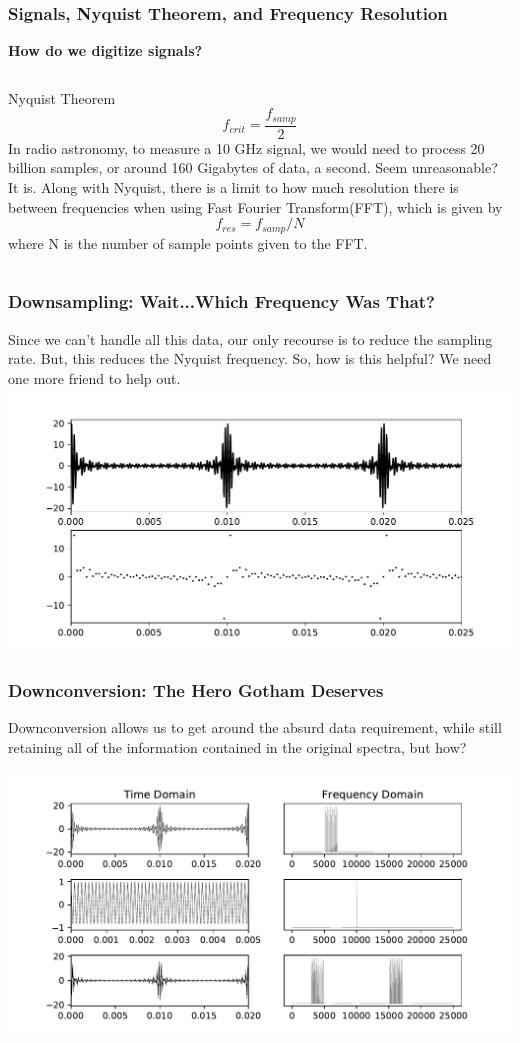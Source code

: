\documentclass{beamer}
\begin{document}
\begin{frame}
\frametitle{Signals, Nyquist Theorem, and Frequency Resolution}
\center \textbf{How do we digitize signals?}
\bigskip
\begin{columns}
Nyquist Theorem
\begin{equation}
f_{crit} = \frac{f_{samp}}{2}
\end{equation}
In radio astronomy, to measure a 10 GHz signal, we would need to process 20 billion samples, or around 160 Gigabytes of data, a second.  Seem unreasonable? It is.
Along with Nyquist, there is a limit to how much resolution there is between frequencies when using Fast Fourier Transform(FFT), which is given by 
\begin{equation}
f_{res} = f_{samp}/N
\end{equation}
where N is the number of sample points given to the FFT.
\end{columns}
\end{frame}

\begin{frame}
\frametitle{Downsampling: Wait...Which Frequency Was That?}
Since we can't handle all this data, our only recourse is to reduce the sampling rate.  But, this reduces the Nyquist frequency. So, how is this helpful? We need one more friend to help out.
\includegraphics[scale=.55]{Figure_3.pdf}
\end{frame}

\begin{frame}
\frametitle{Downconversion:  The Hero Gotham Deserves}
\center Downconversion allows us to get around the absurd data requirement, while still retaining all of the information contained in the original spectra, but how?

\includegraphics[scale=.58]{Figure_4.pdf}
\end{frame}
\end{document}
